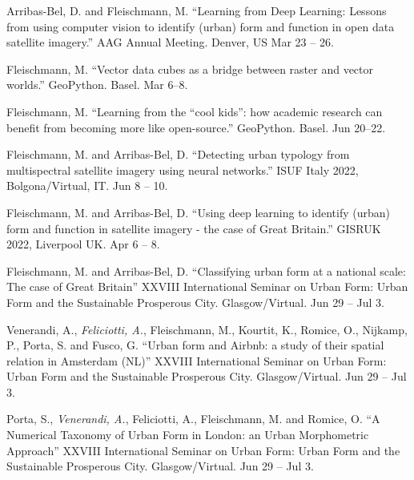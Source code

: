 \documentclass[12pt,a4paper]{report}
\begin{document}
\begin{tablist}
        \item[2023] \tab{}Arribas-Bel, D. and Fleischmann, M. \enquote{Learning from Deep Learning: Lessons from using computer vision to identify (urban) form and function in open data satellite imagery.} AAG Annual Meeting. Denver, US \@ Mar 23 -- 26.

        \item[2023] \tab{}Fleischmann, M. \enquote{Vector data cubes as a bridge between raster and vector worlds.} GeoPython. Basel. \@ Mar 6--8.

        \item[2022] \tab{}Fleischmann, M. \enquote{Learning from the “cool kids”: how academic research can benefit from becoming more like open-source.} GeoPython. Basel. \@ Jun 20--22.

        \item[2022] \tab{}Fleischmann, M. and Arribas-Bel, D. \enquote{Detecting urban typology from multispectral satellite imagery using neural networks.} ISUF Italy 2022, Bolgona/Virtual, IT. Jun 8 -- 10.

        \item[2022] \tab{}Fleischmann, M. and Arribas-Bel, D. \enquote{Using deep learning to identify (urban) form and function in satellite imagery - the case of Great Britain.} GISRUK 2022, Liverpool UK. Apr 6 -- 8.

        \item[2021] \tab{}Fleischmann, M. and Arribas-Bel, D. \enquote{Classifying urban form at a national scale: The case of Great Britain} XXVIII International Seminar on Urban Form: Urban Form and the Sustainable Prosperous City. Glasgow/Virtual. \@ Jun 29 -- Jul 3.

        \item[2021] \tab{}Venerandi, A., \textit{Feliciotti, A.}, Fleischmann, M., Kourtit, K., Romice, O., Nijkamp, P., Porta, S. and Fusco, G. \enquote{Urban form and Airbnb: a study of their spatial relation in Amsterdam (NL)} XXVIII International Seminar on Urban Form: Urban Form and the Sustainable Prosperous City. Glasgow/Virtual. \@ Jun 29 -- Jul 3.

        \item[2021] \tab{}Porta, S., \textit{Venerandi, A.}, Feliciotti, A., Fleischmann, M. and Romice, O. \enquote{A Numerical Taxonomy of Urban Form in London: an Urban Morphometric Approach} XXVIII International Seminar on Urban Form: Urban Form and the Sustainable Prosperous City. Glasgow/Virtual. \@ Jun 29 -- Jul 3.


\end{tablist}
\end{document}
